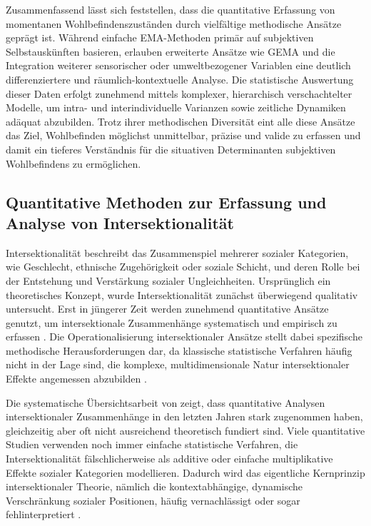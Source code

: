 Zusammenfassend lässt sich feststellen, dass die quantitative Erfassung von momentanen Wohlbefindenszuständen durch vielfältige methodische Ansätze geprägt ist. Während einfache EMA-Methoden primär auf subjektiven Selbstauskünften basieren, erlauben erweiterte Ansätze wie GEMA und die Integration weiterer sensorischer oder umweltbezogener Variablen eine deutlich differenziertere und räumlich-kontextuelle Analyse. Die statistische Auswertung dieser Daten erfolgt zunehmend mittels komplexer, hierarchisch verschachtelter Modelle, um intra- und interindividuelle Varianzen sowie zeitliche Dynamiken adäquat abzubilden. Trotz ihrer methodischen Diversität eint alle diese Ansätze das Ziel, Wohlbefinden möglichst unmittelbar, präzise und valide zu erfassen und damit ein tieferes Verständnis für die situativen Determinanten subjektiven Wohlbefindens zu ermöglichen.

\subsection{Quantitative Methoden zur Erfassung und Analyse von Intersektionalität}

Intersektionalität beschreibt das Zusammenspiel mehrerer sozialer Kategorien, wie Geschlecht, ethnische Zugehörigkeit oder soziale Schicht, und deren Rolle bei der Entstehung und Verstärkung sozialer Ungleichheiten. Ursprünglich ein theoretisches Konzept, wurde Intersektionalität zunächst überwiegend qualitativ untersucht. Erst in jüngerer Zeit werden zunehmend quantitative Ansätze genutzt, um intersektionale Zusammenhänge systematisch und empirisch zu erfassen \parencite{bauerIntersectionalityQuantitativeResearch2021}. Die Operationalisierung intersektionaler Ansätze stellt dabei spezifische methodische Herausforderungen dar, da klassische statistische Verfahren häufig nicht in der Lage sind, die komplexe, multidimensionale Natur intersektionaler Effekte angemessen abzubilden \parencite{bowlegInvitedReflectionQuantifying2016, scottIntersectionalityQuantitativeMethods2017}.

Die systematische Übersichtsarbeit von \textcite{bauerIntersectionalityQuantitativeResearch2021} zeigt, dass quantitative Analysen intersektionaler Zusammenhänge in den letzten Jahren stark zugenommen haben, gleichzeitig aber oft nicht ausreichend theoretisch fundiert sind. Viele quantitative Studien verwenden noch immer einfache statistische Verfahren, die Intersektionalität fälschlicherweise als additive oder einfache multiplikative Effekte sozialer Kategorien modellieren. Dadurch wird das eigentliche Kernprinzip intersektionaler Theorie, nämlich die kontextabhängige, dynamische Verschränkung sozialer Positionen, häufig vernachlässigt oder sogar fehlinterpretiert \parencite{bowlegInvitedReflectionQuantifying2016}.

